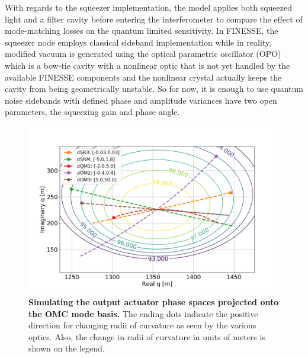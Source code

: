 	With regards to the squeezer implementation, the model applies both squeezed light and a filter cavity before entering the interferometer to compare the effect of mode-matching losses on the quantum limited sensitivity.  In FINESSE, the squeezer node employs classical sideband implementation while in reality, modified vacuum is generated using the optical parametric oscillator (OPO) which is a bow-tie cavity with a nonlinear optic that is not yet handled by the available FINESSE components and the nonlinear crystal actually keeps the cavity from being geometrically unstable. So for now, it is enough to use quantum noise sidebands with defined phase and amplitude variances have two open parameters, the squeezing gain and phase angle. 
	
	\begin{figure}[ht!]
		\centering
		\includegraphics[width=0.9 \textwidth]{../Figures/OutputAct_Gouyphase.png}
		\caption[Simulating the output actuator phase spaces projected onto the OMC mode basis.]
		{\textbf{Simulating the output actuator phase spaces projected onto the OMC mode basis.} The ending dots indicate the positive direction for changing radii of curvature as seen by the various optics.  Also, the change in radii of curvature in units of meters is shown on the legend.
		}
		\label{fig:act_phase_space}
	\end{figure}
	
